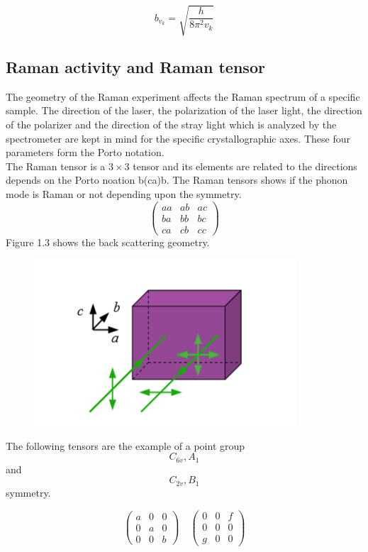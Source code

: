 \documentclass[openany,11pt,a4paper]{report}
\begin{document}
\begin{equation}
b_{v_{k}}=\sqrt{\frac{h}{8 \pi^{2} v_{k}}}
\end{equation} 
\cite{bib2}





\subsection*{Raman activity and Raman tensor}
  

The geometry of the Raman experiment affects the Raman spectrum of a specific sample. The direction of the laser, the polarization of the laser light, the direction of the polarizer and the direction of the stray light which is analyzed by the spectrometer are  kept in mind for the specific crystallographic axes. These four parameters form the Porto notation. \\
The Raman tensor is a $3\times 3$  
tensor     
and its elements are related to the directions depends on the Porto noation b(ca)b. The Raman tensors shows if the phonon mode is Raman or not depending upon the symmetry. 
$$
\left(\begin{array}{lll}{a a} & {a b} & {a c} \\ {b a} & {b b} & {b c} \\ {c a} & {c b} & {c c}\end{array}\right)
$$
Figure 1.3 shows the back scattering geometry. 

\begin{figure}[H]
\centering
\includegraphics[scale=1]{geometry.PNG}    
\caption{}
\label{Fig:67}
\end{figure}

The following tensors are the example of a point group $$
C_{6 v}, A_{1}
$$ and $$
C_{2 v}, B_{1}
$$ symmetry.

$$
\left(\begin{array}{lll}{a} & {0} & {0} \\ {0} & {a} & {0} \\ {0} & {0} & {b}\end{array}\right) \quad\left(\begin{array}{lll}{0} & {0} & {f} \\ {0} & {0} & {0} \\ {g} & {0} & {0}\end{array}\right)
$$
\end{document}
